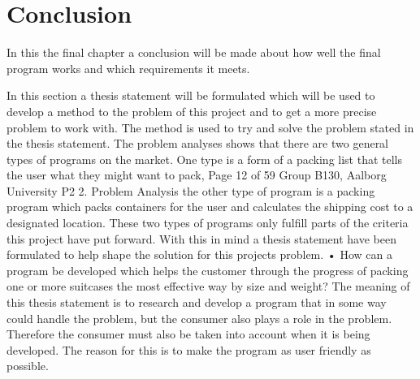 \chapter{Conclusion}
In this the final chapter a conclusion will be made about how well the final program works and which requirements it meets.



In this section a thesis statement will be formulated which will be used to develop a
method to the problem of this project and to get a more precise problem to work with.
The method is used to try and solve the problem stated in the thesis statement.
The problem analyses shows that there are two general types of programs on the market.
One type is a form of a packing list that tells the user what they might want to pack,
Page 12 of 59
Group B130, Aalborg University P2 2. Problem Analysis
the other type of program is a packing program which packs containers for the user and
calculates the shipping cost to a designated location. These two types of programs only
fulfill parts of the criteria this project have put forward. With this in mind a thesis
statement have been formulated to help shape the solution for this projects problem.
• How can a program be developed which helps the customer through the progress of
packing one or more suitcases the most effective way by size and weight?
The meaning of this thesis statement is to research and develop a program that in
some way could handle the problem, but the consumer also plays a role in the problem.
Therefore the consumer must also be taken into account when it is being developed. The
reason for this is to make the program as user friendly as possible.

